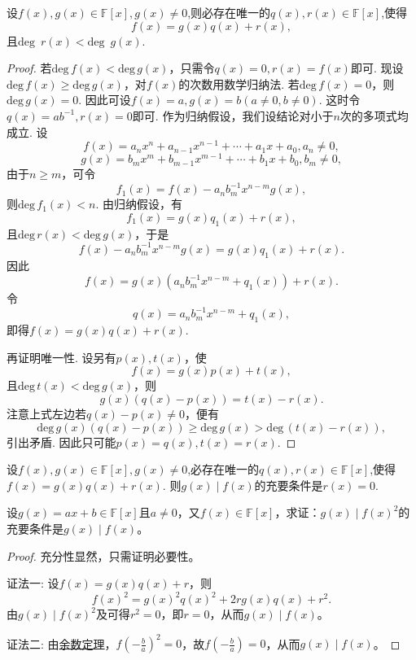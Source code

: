 \documentclass[../../main.tex]{subfiles}%
\begin{document}
\begin{theorem}[多项式的带余除法]\label{theorem:多项式的带余除法}
设\(f(x),g(x)\in\mathbb{F}[x],g(x)\neq 0\),则必存在唯一的\(q(x),r(x)\in\mathbb{F}[x]\),使得
\[
f(x)=g(x)q(x)+r(x),
\]
且\(\text{deg }\,r(x)<\text{deg }\,g(x)\).
\end{theorem}
\begin{proof}

若\(\mathrm{deg }\,f(x)<\mathrm{deg }\,g(x)\)，只需令\(q(x)=0,r(x)=f(x)\)即可.
现设\(\mathrm{deg }\,f(x)\geqslant \mathrm{deg }\,g(x)\)，对\(f(x)\)的次数用数学归纳法. 若\(\mathrm{deg }\,f(x)=0\)，则\(\mathrm{deg }\,g(x)=0\). 因此可设\(f(x)=a,g(x)=b(a\neq 0,b\neq 0)\). 这时令\(q(x)=ab^{-1},r(x)=0\)即可. 作为归纳假设，我们设结论对小于\(n\)次的多项式均成立. 设
\[
f(x)=a_nx^n + a_{n - 1}x^{n - 1}+\cdots+a_1x + a_0, a_n\neq 0,
\]
\[
g(x)=b_mx^m + b_{m - 1}x^{m - 1}+\cdots+b_1x + b_0, b_m\neq 0,
\]
由于\(n\geqslant  m\)，可令
\[
f_1(x)=f(x)-a_nb_m^{-1}x^{n - m}g(x),
\]
则\(\mathrm{deg }\,f_1(x)<n\). 由归纳假设，有
\[
f_1(x)=g(x)q_1(x)+r(x),
\]
且\(\mathrm{deg }\,r(x)<\mathrm{deg }\,g(x)\)，于是
\[
f(x)-a_nb_m^{-1}x^{n - m}g(x)=g(x)q_1(x)+r(x).
\]
因此
\[
f(x)=g(x)(a_nb_m^{-1}x^{n - m}+q_1(x))+r(x).
\]
令
\[
q(x)=a_nb_m^{-1}x^{n - m}+q_1(x),
\]
即得$f(x)=g(x)q(x)+r(x)$.

再证明唯一性. 设另有\(p(x),t(x)\)，使
\[
f(x)=g(x)p(x)+t(x),
\]
且\(\mathrm{deg }\,t(x)<\mathrm{deg }\,g(x)\)，则
\[
g(x)(q(x)-p(x))=t(x)-r(x).
\]
注意上式左边若\(q(x)-p(x)\neq 0\)，便有
\[
\mathrm{deg }\,g(x)(q(x)-p(x))\geqslant \mathrm{deg }\,g(x)>\mathrm{deg }\,(t(x)-r(x)),
\]
引出矛盾. 因此只可能\(p(x)=q(x),t(x)=r(x)\).

\end{proof}

\begin{corollary}\label{corollary:整除关于多项式的带余除法的充要条件}
设\(f(x),g(x)\in\mathbb{F}[x],g(x)\neq 0\),必存在唯一的\(q(x),r(x)\in\mathbb{F}[x]\),使得$f(x)=g(x)q(x)+r(x)$. 
则\(g(x)\mid f(x)\)的充要条件是\(r(x)=0\).
\end{corollary}

\begin{example}
设\(g(x)=ax + b\in\mathbb{F}[x]\)且\(a\neq0\)，又\(f(x)\in\mathbb{F}[x]\)，求证：\(g(x)\mid f(x)^2\)的充要条件是\(g(x)\mid f(x)\)。
\end{example}
\begin{proof}

充分性显然，只需证明必要性。

{\color{blue}证法一:}
设\(f(x)=g(x)q(x)+r\)，则
\[
f(x)^2 = g(x)^2q(x)^2 + 2rg(x)q(x)+r^2.
\]
由\(g(x)\mid f(x)^2\)及可得\(r^2 = 0\)，即\(r = 0\)，从而\(g(x)\mid f(x)\)。

{\color{blue}证法二:}
由\hyperref[theorem:余数定理]{余数定理}，\(f\left(-\frac{b}{a}\right)^2 = 0\)，故\(f\left(-\frac{b}{a}\right)= 0\)，从而\(g(x)\mid f(x)\)。

\end{proof}
\end{document}
